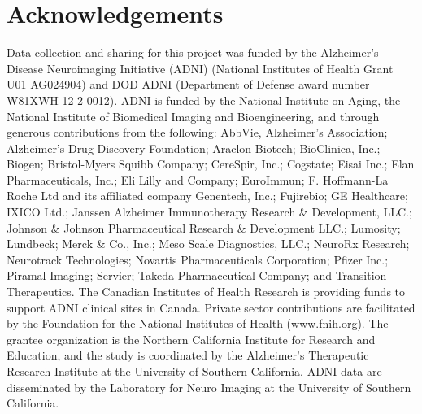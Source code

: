 \documentclass[12pt]{article}
\begin{document}
\hypertarget{acknowledgements}{%
\section{Acknowledgements}\label{acknowledgements}}

Data collection and sharing for this project was funded by the
Alzheimer's Disease Neuroimaging Initiative (ADNI) (National Institutes
of Health Grant U01 AG024904) and DOD ADNI (Department of Defense award
number W81XWH-12-2-0012). ADNI is funded by the National Institute on
Aging, the National Institute of Biomedical Imaging and Bioengineering,
and through generous contributions from the following: AbbVie,
Alzheimer's Association; Alzheimer's Drug Discovery Foundation; Araclon
Biotech; BioClinica, Inc.; Biogen; Bristol-Myers Squibb Company;
CereSpir, Inc.; Cogstate; Eisai Inc.; Elan Pharmaceuticals, Inc.; Eli
Lilly and Company; EuroImmun; F. Hoffmann-La Roche Ltd and its
affiliated company Genentech, Inc.; Fujirebio; GE Healthcare; IXICO
Ltd.; Janssen Alzheimer Immunotherapy Research \& Development, LLC.;
Johnson \& Johnson Pharmaceutical Research \& Development LLC.;
Lumosity; Lundbeck; Merck \& Co., Inc.; Meso Scale Diagnostics, LLC.;
NeuroRx Research; Neurotrack Technologies; Novartis Pharmaceuticals
Corporation; Pfizer Inc.; Piramal Imaging; Servier; Takeda
Pharmaceutical Company; and Transition Therapeutics. The Canadian
Institutes of Health Research is providing funds to support ADNI
clinical sites in Canada. Private sector contributions are facilitated
by the Foundation for the National Institutes of Health (www.fnih.org).
The grantee organization is the Northern California Institute for
Research and Education, and the study is coordinated by the Alzheimer's
Therapeutic Research Institute at the University of Southern California.
ADNI data are disseminated by the Laboratory for Neuro Imaging at the
University of Southern California.



\end{document}
